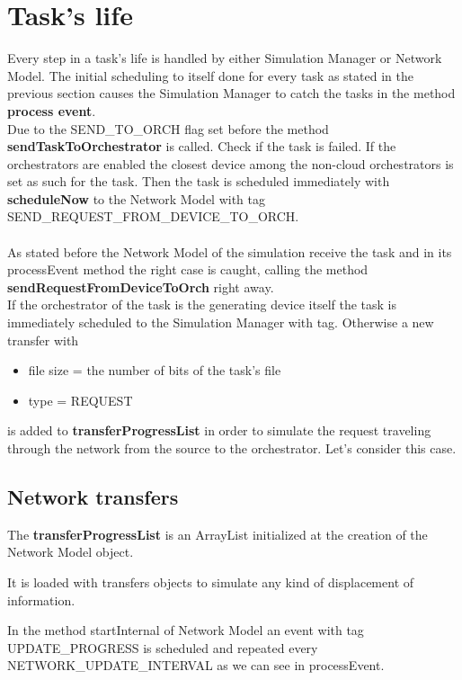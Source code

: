 \documentclass[12pt]{report}
\begin{document}
\section{Task's life}
Every step in a task's life is handled by either Simulation Manager or Network Model.
The initial scheduling to itself done for every task as stated in the previous section causes the Simulation Manager to catch the tasks in the method \textbf{process event}.\\
Due to the SEND\_TO\_ORCH flag set before the method \textbf{sendTaskToOrchestrator} is called.
Check if the task is failed.
If the orchestrators are enabled the closest device among the non-cloud orchestrators is set as such for the task.
Then the task is scheduled immediately with \textbf{scheduleNow} to the Network Model with tag SEND\_REQUEST\_FROM\_DEVICE\_TO\_ORCH.\\
\\
As stated before the Network Model of the simulation receive the task and in its processEvent method the right case is caught, calling the method \textbf{sendRequestFromDeviceToOrch} right away.\\
If the orchestrator of the task is the generating device itself 
the task is immediately scheduled to the Simulation Manager with  tag.
Otherwise a new transfer with
\begin{itemize}
	\item file size = the number of bits of the task's file
	\item type = REQUEST
\end{itemize}
is added to \textbf{transferProgressList} in order to simulate the request traveling through the network from the source to the orchestrator. Let's consider this case.\\

\subsection*{Network transfers}
\label{network_transfer}
The \textbf{transferProgressList} is an ArrayList initialized at the creation of the Network Model object.

It is loaded with transfers objects to simulate any kind of displacement of information.

In the method startInternal of Network Model an event with tag UPDATE\_PROGRESS is scheduled and repeated every NETWORK\_UPDATE\_INTERVAL as we can see in processEvent.
\end{document}

